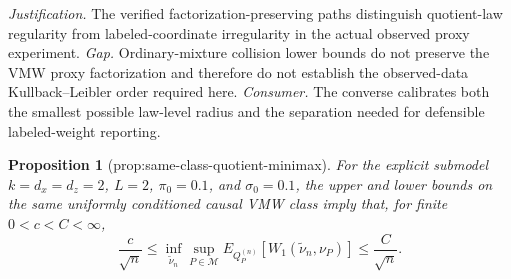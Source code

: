 \documentclass{article}
\newtheorem{proposition}{Proposition}
\begin{document}
\par\smallskip\noindent \textit{Justification.} The verified factorization-preserving paths distinguish quotient-law regularity from labeled-coordinate irregularity in the actual observed proxy experiment. \textit{Gap.} Ordinary-mixture collision lower bounds do not preserve the VMW proxy factorization and therefore do not establish the observed-data Kullback--Leibler order required here. \textit{Consumer.} The converse calibrates both the smallest possible law-level radius and the separation needed for defensible labeled-weight reporting.

\begin{proposition}[prop:same-class-quotient-minimax]\label{prop:same-class-quotient-minimax}
For the explicit submodel \(k=d_x=d_z=2\), \(L=2\), \(\pi_0=0.1\), and \(\sigma_0=0.1\), the upper and lower bounds on the same uniformly conditioned causal VMW class imply that, for finite \(0<c<C<\infty\),
\[
\frac{c}{\sqrt n}\le\inf_{\widetilde\nu_n}\sup_{P\in\mathcal M}E_{Q_P^{(n)}}[W_1(\widetilde\nu_n,\nu_P)]\le\frac{C}{\sqrt n}.
\]
\end{proposition}
\end{document}
